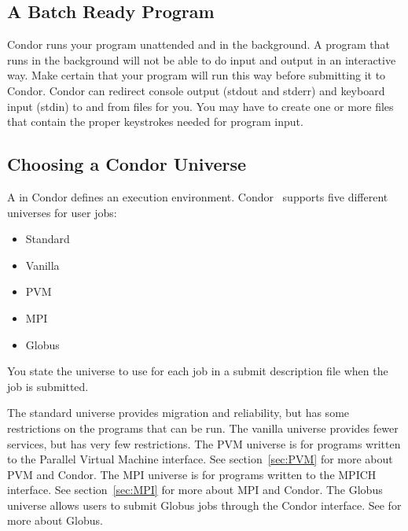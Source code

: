 \subsection{A Batch Ready Program}

Condor runs your program unattended and in the background. 
A program that runs in the background will not be able
to do input and output in an interactive way.
Make certain
that your program will run this way before submitting it to Condor.
Condor can
redirect console output (stdout and stderr) and keyboard input (stdin)
to and from files for you.
You may have to create one or more files that contain
the proper keystrokes needed for program input.

\subsection{\label{sec:Choosing-Universe}
Choosing a Condor Universe}

A  in Condor
defines an execution environment. 
Condor \VersionNotice\ supports five different
universes for user jobs:
\begin{itemize}
	\item Standard
	\item Vanilla
	\item PVM
	\item MPI
	\item Globus
\end{itemize}
You state the universe to use for each job in a
submit description file when the job is submitted. 

The standard universe provides migration and reliability, but has some
restrictions on the programs that can be run. 
The vanilla universe provides fewer services, but has very few
restrictions.
The PVM universe is for programs written to the Parallel Virtual
Machine interface.  See section~\ref{sec:PVM} for more about PVM and Condor.
The MPI universe is for programs written to the MPICH interface.
See section~\ref{sec:MPI} for more about MPI and Condor.
The Globus universe allows users to submit Globus jobs through the
Condor interface.  See  for more about Globus.

